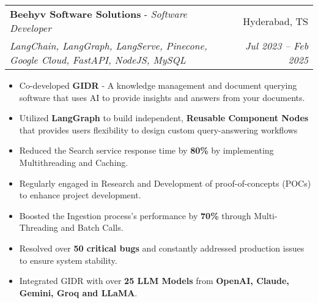 \documentclass[letterpaper,11pt]{article}
\makeatletter
\newcommand{\resumeItem}[1]{
  \item\small{
    {#1 \vspace{-2pt}}
  }
}
\newcommand{\resumeExperienceheading}[5]{
  \vspace{-2pt}\item
    \begin{tabular*}{0.97\textwidth}[t]{l@{\extracolsep{\fill}}r}
      \textbf{#1} - \textit{\small#2} & #3 \\
      \textit{\small#4} & \textit{\footnotesize{#5}} \\
    \end{tabular*}\vspace{-7pt}
}
\newcommand{\resumeSubSubheading}[2]{
    \item
    \begin{tabular*}{0.97\textwidth}{l@{\extracolsep{\fill}}r}
      \textit{\small{#1}} & \textit{\footnotesize{#2}} \\
    \end{tabular*}\vspace{-7pt}
}
\newcommand{\resumeItemListStart}{\begin{itemize}}
\newcommand{\resumeItemListEnd}{\end{itemize}\vspace{-5pt}}
\makeatother
\begin{document}
\vspace{5pt}

\resumeExperienceheading
{Beehyv Software Solutions}{Software Developer}{Hyderabad, TS}
{LangChain, LangGraph, LangServe, Pinecone, Google Cloud, FastAPI, NodeJS, MySQL}{Jul 2023 -- Feb 2025}
\resumeItemListStart
\resumeItem{Co-developed \textbf{GIDR} - A knowledge management and document querying software that uses AI to provide insights and answers from your documents.}
\resumeItem{Utilized \textbf{LangGraph} to build independent, \textbf{Reusable Component Nodes} that provides users flexibility to design custom query-answering workflows}
\resumeItem{Reduced the Search service response time by \textbf{80\%} by implementing Multithreading and Caching.}
\resumeItem{Regularly engaged in Research and Development of proof-of-concepts (POCs) to enhance project development.}
\resumeItem{Boosted the Ingestion process's performance by \textbf{70\%} through Multi-Threading and Batch Calls.}
\resumeItem{Resolved over \textbf{50 critical bugs} and constantly addressed production issues to ensure system stability.}
\resumeItem{Integrated GIDR with over \textbf{25 LLM Models} from \textbf{OpenAI, Claude, Gemini, Groq and LLaMA}.}
\resumeItemListEnd

\end{document}
